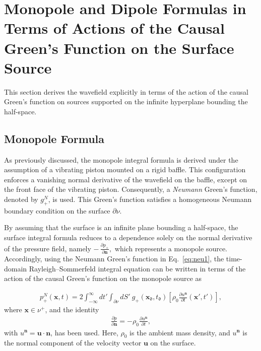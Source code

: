 \documentclass[11pt,reqno]{amsart}
\theoremstyle{remark}
\theoremstyle{italic_lemma}
\newcommand{\bx}{\boldsymbol{x}}
\newcommand{\bu}{\boldsymbol{u}}
\newcommand{\bn}{\boldsymbol{n}}
\newcommand{\fd}{\mathfrak{d}}
\begin{document}
\section{Monopole and Dipole Formulas in Terms of Actions of the Causal Green's Function on the Surface Source} \label{sec:sum}

\noindent
This section derives the wavefield explicitly in terms of the action of the causal Green's function on sources supported on the infinite hyperplane bounding the half-space.



\subsection{Monopole Formula}

As previously discussed, the monopole integral formula is derived under the assumption of a vibrating piston mounted on a rigid baffle. This configuration enforces a vanishing normal derivative of the wavefield on the baffle, except on the front face of the vibrating piston. Consequently, a \textit{Neumann} Green's function, denoted by \( g_+^N \), is used. This Green's function satisfies a homogeneous Neumann boundary condition on the surface \( \partial \nu \). 

\noindent
By assuming that the surface is an infinite plane bounding a half-space, the surface integral formula reduces to a dependence solely on the normal derivative of the pressure field, namely
\(
-\,\frac{\partial p_+}{\partial \bn},
\)
which represents a monopole source. Accordingly, using the Neumann Green's function in Eq.~\eqref{eq:neu1}, the time-domain Rayleigh–Sommerfeld integral equation can be written in terms of the action of the causal Green’s function on the monopole source as

\begin{align} \label{eq:gr-monopole}
    p_+^N(\bx, t) = 2 \int_{-\infty}^{\infty} dt' \int_{\partial \nu} dS' \ g_+(\bx_{\fd}, t_{\fd}) \left[ \rho_0 \frac{\partial u^{\bn}}{\partial t} (\bx', t') \right],
\end{align}
where \( \bx \in \nu^+ \), and the identity
\begin{align}
    \frac{\partial p}{\partial \bn} = - \rho_0 \frac{\partial u^{\bn}}{\partial t},
\end{align}
with \( u^{\bn} = \bu \cdot \bn \), has been used. Here, \( \rho_0 \) is the ambient mass density, and \( u^{\bn} \) is the normal component of the velocity vector \( \bu \) on the surface.
\end{document}
